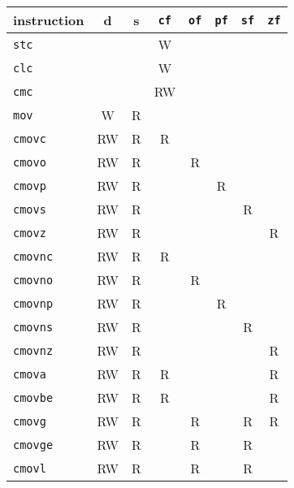 \documentclass[a4paper,11pt]{kth-mag}
\begin{document}
\begin{table}
\centering
\begin{tabular}{l|cc|ccccc}
instruction   & d  & s  & \verb|cf| & \verb|of| & \verb|pf| & \verb|sf| & \verb|zf| \\
\hline
\verb|stc|    &    &    & W         &           &           &           &           \\
\verb|clc|    &    &    & W         &           &           &           &           \\
\verb|cmc|    &    &    & RW        &           &           &           &           \\
\hline
\verb|mov|    & W  & R  &           &           &           &           &           \\
\verb|cmovc|  & RW & R  & R         &           &           &           &           \\
\verb|cmovo|  & RW & R  &           & R         &           &           &           \\
\verb|cmovp|  & RW & R  &           &           & R         &           &           \\
\verb|cmovs|  & RW & R  &           &           &           & R         &           \\
\verb|cmovz|  & RW & R  &           &           &           &           & R         \\
\verb|cmovnc| & RW & R  & R         &           &           &           &           \\
\verb|cmovno| & RW & R  &           & R         &           &           &           \\
\verb|cmovnp| & RW & R  &           &           & R         &           &           \\
\verb|cmovns| & RW & R  &           &           &           & R         &           \\
\verb|cmovnz| & RW & R  &           &           &           &           & R         \\
\verb|cmova|  & RW & R  & R         &           &           &           & R         \\
\verb|cmovbe| & RW & R  & R         &           &           &           & R         \\
\verb|cmovg|  & RW & R  &           & R         &           & R         & R         \\
\verb|cmovge| & RW & R  &           & R         &           & R         &           \\
\verb|cmovl|  & RW & R  &           & R         &           & R         &           \\

\end{tabular}
\end{table}
\end{document}
